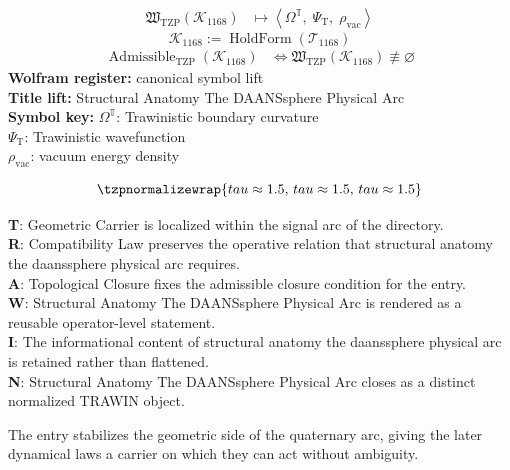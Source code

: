 \noindent
\begin{minipage}[t]{0.48\linewidth}
\begingroup
\small
\[
\begin{aligned}
\mathfrak{W}_{\mathrm{TZP}}\!\left(\mathcal{K}_{1168}\right)
&\longmapsto
\left\langle \Omega^{\mathbb{T}},\; \Psi_{\mathrm{T}},\; \rho_{\mathrm{vac}} \right\rangle
\end{aligned}
\]
\[
\mathcal{K}_{1168}
:=
\operatorname{HoldForm}\!\left(\mathcal{T}_{1168}\right)
\]
\[
\begin{aligned}
\operatorname{Admissible}_{\mathrm{TZP}}\!\left(\mathcal{K}_{1168}\right)
&\Longleftrightarrow
\mathfrak{W}_{\mathrm{TZP}}\!\left(\mathcal{K}_{1168}\right)\not\equiv\varnothing
\end{aligned}
\]
\textbf{Wolfram register:} canonical symbol lift\\
\textbf{Title lift:} Structural Anatomy The DAANSsphere Physical Arc\\
\textbf{Symbol key:} \(\Omega^{\mathbb{T}}\): Trawinistic boundary curvature\\ \(\Psi_{\mathrm{T}}\): Trawinistic wavefunction\\ \(\rho_{\mathrm{vac}}\): vacuum energy density
\par
\endgroup
\end{minipage}\hfill
\begin{minipage}[t]{0.48\linewidth}
\[
\tzpnormalizewrap{tau \approx 1.5,\,tau \approx 1.5,\,tau \approx 1.5}
\]

\small
\textbf{T}: Geometric Carrier is localized within the signal arc of the directory.\\
\textbf{R}: Compatibility Law preserves the operative relation that structural anatomy the daanssphere physical arc requires.\\
\textbf{A}: Topological Closure fixes the admissible closure condition for the entry.\\
\textbf{W}: Structural Anatomy The DAANSsphere Physical Arc is rendered as a reusable operator-level statement.\\
\textbf{I}: The informational content of structural anatomy the daanssphere physical arc is retained rather than flattened.\\
\textbf{N}: Structural Anatomy The DAANSsphere Physical Arc closes as a distinct normalized TRAWIN object.
\normalsize
\end{minipage}

The entry stabilizes the geometric side of the quaternary arc, giving the later dynamical laws a carrier on which they can act without ambiguity.
\clearpage

